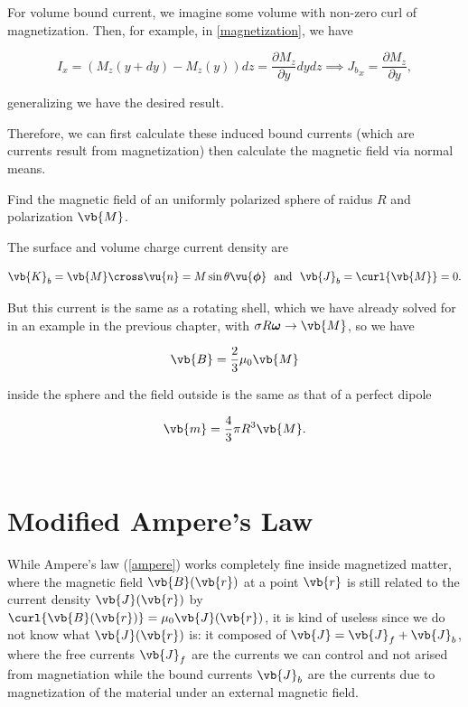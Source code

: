 \documentclass[english,a4paper,12pt]{report}
\begin{document}
For volume bound current, we imagine some volume with non-zero curl of magnetization. Then, for example, in \cref{magnetization}, we have

\begin{equation}
    I_{x} = (M_{z}(y+dy) - M_{z}(y) )dz = \frac{\partial M_{z} }{\partial y}dydz \implies {J_{b}}_{x} = \frac{\partial M_{z} }{\partial y},     
\end{equation}

generalizing we have the desired result.


Therefore, we can first calculate these induced bound currents (which are currents result from magnetization) then calculate the magnetic field via normal means.

{Find the magnetic field of an uniformly polarized sphere of raidus \(R\) and polarization \(\vb{M} \).}
{The surface and volume charge current density are 

\begin{equation}
    \vb{K} _{b} = \vb{M} \cross \vu{n} = M\sin \theta \vu{\boldsymbol{\phi } } ~\text { and }~  \vb{J} _{b} = \curl{\vb{M} } = 0.
\end{equation}

But this current is the same as a rotating shell, which we have already solved for in an example in the previous chapter, with \(\sigma R \boldsymbol{\omega }  \to \vb{M} \), so we have 

\begin{equation}
    \vb{B} = \frac{2}{3}\mu_0 \vb{M}  
\end{equation}

inside the sphere and the field outside is the same as that of a perfect dipole 

\begin{equation}
    \vb{m} = \frac{4}{3} \pi R^3 \vb{M} . 
\end{equation}~
}

\section{Modified Ampere's Law} \label{modb} 

While Ampere's law (\cref{ampere}) works completely fine inside magnetized matter, where the magnetic field \(\vb{B} (\vb{r})\) at a point \(\vb{r} \) is still related to the current density \(\vb{J} (\vb{r} )\) by \(\curl{\vb{B} (\vb{r} )} = \mu_0 \vb{J} (\vb{r} ) \), it is kind of useless since we do not know what \(\vb{J} (\vb{r} )\) is: it composed of \(\vb{J} = \vb{J} _{f} + \vb{J} _{b}  \), where the free currents \(\vb{J} _{f} \) are the currents we can control and not arised from magnetiation while the bound currents \(\vb{J} _{b} \) are the currents due to magnetization of the material under an external magnetic field. 
\end{document}
